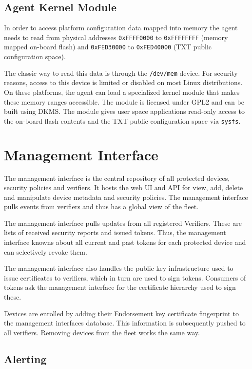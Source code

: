 \documentclass[a4paper,oneside,10pt,extrafontsizes]{memoir}
\begin{document}
\subsection*{Agent Kernel Module}

In order to access platform configuration data mapped into memory the agent
needs to read from physical addresses \texttt{0xFFFF0000} to \texttt{0xFFFFFFFF}
(memory mapped on-board flash) and \texttt{0xFED30000} to \texttt{0xFED40000}
(TXT public configuration space).

The classic way to read this data is through the \texttt{/dev/mem} device. For
security reasons, access to this device is limited or disabled on most Linux
distributions. On these platforms, the agent can load a specialized kernel
module that makes these memory ranges accessible. The module is licensed under
GPL2 and can be built using DKMS. The module gives user space applications
read-only access to the on-board flash contents and the TXT public
configuration space via \texttt{sysfs}.

\section{Management Interface}

The management interface is the central repository of all protected devices,
security policies and verifiers. It hosts the web UI and API for view, add,
delete and manipulate device metadata and security policies. The
management interface pulls events from verifiers and thus has a global
view of the fleet.

The management interface pulls updates from all registered Verifiers. These are
lists of received security reports and issued tokens. Thus, the management
interface knowns about all current and past tokens for each protected device
and can selectively revoke them.

The management interface also handles the public key infrastructure used to
issue certificates to verifiers, which in turn are used to sign tokens.
Consumers of tokens ask the management interface for the certificate hierarchy
used to sign these.

Devices are enrolled by adding their Endorsement key certificate fingerprint
to the management interfaces database. This information is subsequently pushed
to all verifiers. Removing devices from the fleet works the same way.

\subsection*{Alerting}
\end{document}
